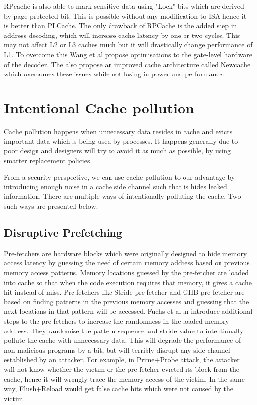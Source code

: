 RPcache is also able to mark sensitive data using "Lock" bits which are derived by page protected bit.
This is possible without any modification to ISA hence it is better than PLCache. The only drawback
of RPCache is the added step in address decoding, which will increase cache latency by one or two cycles.
This may not affect L2 or L3 caches much but it will drastically change performance of L1.
To overcome this Wang et al propose optimisations to the gate-level hardware of the decoder.
The also propose an improved cache architecture called Newcache  which overcomes
these issues while not losing in power and performance.

\section{Intentional Cache pollution}

Cache pollution happens when unnecessary data resides in cache and evicts important data which
is being used by processes. It happens generally due to poor design and designers will
try to avoid it as much as possible, by using smarter replacement policies.

From a security perspective, we can use cache pollution to our advantage by introducing enough noise in
a cache side channel such that is hides leaked information. There are multiple ways of intentionally
polluting the cache. Two such ways are presented below.

\subsection{Disruptive Prefetching}

Pre-fetchers are hardware blocks which were originally designed to hide memory access latency
by guessing the need of certain memory address based on previous memory access patterns.
Memory locations guessed by the pre-fetcher are loaded into cache so that when the code
execution requires that memory, it gives a cache hit instead of miss. Pre-fetchers like
Stride pre-fetcher and GHB pre-fetcher are based on finding patterns in the previous memory accesses
and guessing that the next locations in that pattern will be accessed. Fuchs et al in 
introduce additional steps to the pre-fetchers to increase the randomness in the loaded memory address.
They randomise the pattern sequence and stride value to intentionally pollute the cache with unnecessary data.
This will degrade the performance of non-malicious programs by a bit, but will terribly disrupt any
side channel established by an attacker. For example, in Prime+Probe attack, the attacker will not know
whether the victim or the pre-fetcher evicted its block from the cache, hence it will wrongly trace the memory
access of the victim. In the same way, Flush+Reload would get false cache hits which were not caused by the victim.

